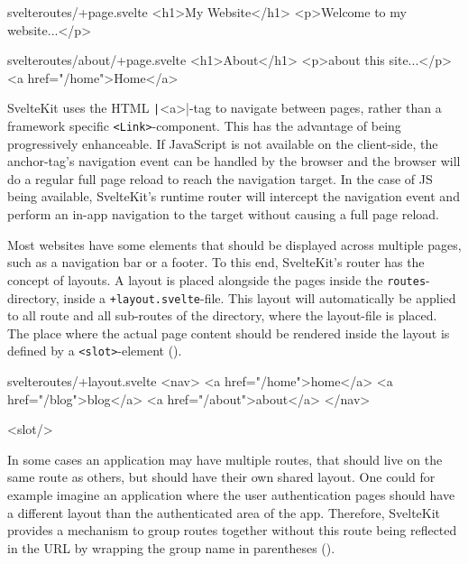 \begin{listing}[h!]
\begin{myminted}{svelte}{routes/+page.svelte}
<h1>My Website</h1>
<p>Welcome to my website...</p>
\end{myminted}
\begin{myminted}{svelte}{routes/about/+page.svelte}
<h1>About</h1>
<p>about this site...</p>
<a href="/home">Home</a>
\end{myminted}
\caption{Example page-definitions in SvelteKit.}
\label{fig:sveltekit-page-file}
\end{listing}

SvelteKit uses the HTML \texttt|<a>|-tag to navigate between pages, rather than a framework specific \texttt{<Link>}-component. This has the advantage of being progressively enhanceable. If JavaScript is not available on the client-side, the anchor-tag's navigation event can be handled by the browser and the browser will do a regular full page reload to reach the navigation target. In the case of JS being available, SvelteKit's runtime router will intercept the navigation event and perform an in-app navigation to the target without causing a full page reload.

Most websites have some elements that should be displayed across multiple pages, such as a navigation bar or a footer. To this end, SvelteKit's router has the concept of layouts. A layout is placed alongside the pages inside the \texttt{routes}-directory, inside a \texttt{+layout.svelte}-file. This layout will automatically be applied to all route and all sub-routes of the directory, where the layout-file is placed. The place where the actual page content should be rendered inside the layout is defined by a \texttt{<slot>}-element ().

\begin{listing}[h!]
\begin{myminted}{svelte}{routes/+layout.svelte}
<nav>
  <a href="/home">home</a>
  <a href="/blog">blog</a>
  <a href="/about">about</a>
</nav>

<slot/>
\end{myminted}
\caption{Example for a layout that provides a navigation bar.}
\label{fig:sveltekit-layout}
\end{listing}

In some cases an application may have multiple routes, that should live on the same route as others, but should have their own shared layout. One could for example imagine an application where the user authentication pages should have a different layout than the authenticated area of the app. Therefore, SvelteKit provides a mechanism to group routes together without this route being reflected in the URL by wrapping the group name in parentheses ().

